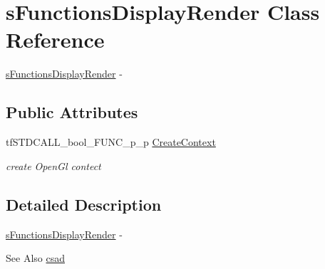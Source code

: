 \hypertarget{structs_functions_display_render}{\section{s\-Functions\-Display\-Render Class Reference}
\label{structs_functions_display_render}
}


\hyperlink{structs_functions_display_render}{s\-Functions\-Display\-Render} -\/  


\subsection*{Public Attributes}
\begin{DoxyCompactItemize}
\item 
\hypertarget{structs_functions_display_render_a07e71869468395f0d8e007f8412f5856}{tf\-S\-T\-D\-C\-A\-L\-L\-\_\-bool\-\_\-\-F\-U\-N\-C\-\_\-p\-\_\-p \hyperlink{structs_functions_display_render_a07e71869468395f0d8e007f8412f5856}{Create\-Context}}\label{structs_functions_display_render_a07e71869468395f0d8e007f8412f5856}

\begin{DoxyCompactList}\small\item\em create Open\-Gl contect \end{DoxyCompactList}\end{DoxyCompactItemize}


\subsection{Detailed Description}
\hyperlink{structs_functions_display_render}{s\-Functions\-Display\-Render} -\/ 

\begin{DoxySeeAlso}{See Also}
\hyperlink{namespacecsad}{csad} 
\end{DoxySeeAlso}
